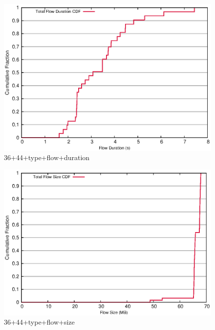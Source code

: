 \documentclass[landscape]{article}
\begin{document}
\begin{figure}[!hbt]
\centering
\includegraphics[width=1\textwidth]{36_44_type_flow_duration.eps}
\caption{36+44+type+flow+duration}

\end{figure}

\newpage

\begin{figure}[!hbt]
\centering
\includegraphics[width=1\textwidth]{36_44_type_flow_size.eps}
\caption{36+44+type+flow+size}

\end{figure}


\newpage
\end{document}
